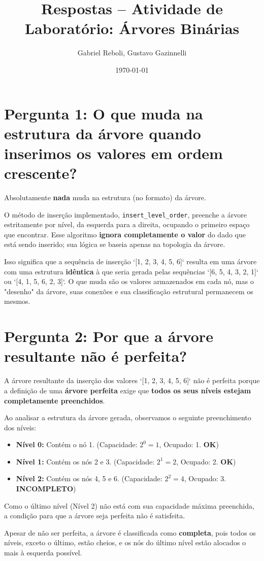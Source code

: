 \documentclass[12pt, a4paper]{article}
\title{Respostas -- Atividade de Laboratório: Árvores Binárias}
\author{Gabriel Reboli, Gustavo Gazinnelli}
\date{\today}
\begin{document}
\maketitle
\thispagestyle{empty} 
\vspace{2cm}

\section*{Pergunta 1: O que muda na estrutura da árvore quando inserimos os valores em ordem crescente?}

Absolutamente \textbf{nada} muda na estrutura (no formato) da árvore.

O método de inserção implementado, \texttt{insert\_level\_order}, preenche a árvore estritamente por nível, da esquerda para a direita, ocupando o primeiro espaço que encontrar. Esse algoritmo \textbf{ignora completamente o valor} do dado que está sendo inserido; sua lógica se baseia apenas na topologia da árvore.

Isso significa que a sequência de inserção `[1, 2, 3, 4, 5, 6]` resulta em uma árvore com uma estrutura \textbf{idêntica} à que seria gerada pelas sequências `[6, 5, 4, 3, 2, 1]` ou `[4, 1, 5, 6, 2, 3]`. O que muda são os valores armazenados em cada nó, mas o "desenho" da árvore, suas conexões e sua classificação estrutural permanecem os mesmos.



\section*{Pergunta 2: Por que a árvore resultante não é perfeita?}

A árvore resultante da inserção dos valores `[1, 2, 3, 4, 5, 6]` não é perfeita porque a definição de uma \textbf{árvore perfeita} exige que \textbf{todos os seus níveis estejam completamente preenchidos}.

Ao analisar a estrutura da árvore gerada, observamos o seguinte preenchimento dos níveis:
\begin{itemize}
    \item \textbf{Nível 0:} Contém o nó 1. (Capacidade: $2^0=1$, Ocupado: 1. \textbf{OK})
    \item \textbf{Nível 1:} Contém os nós 2 e 3. (Capacidade: $2^1=2$, Ocupado: 2. \textbf{OK})
    \item \textbf{Nível 2:} Contém os nós 4, 5 e 6. (Capacidade: $2^2=4$, Ocupado: 3. \textbf{INCOMPLETO})
\end{itemize}

Como o último nível (Nível 2) não está com sua capacidade máxima preenchida, a condição para que a árvore seja perfeita não é satisfeita.

Apesar de não ser perfeita, a árvore é classificada como \textbf{completa}, pois todos os níveis, exceto o último, estão cheios, e os nós do último nível estão alocados o mais à esquerda possível.
\end{document}
